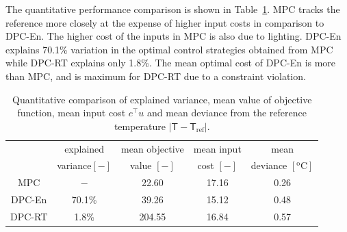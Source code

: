 The quantitative performance comparison is shown in Table~\ref{T:comparison}. MPC tracks the reference more closely at the expense of higher input costs in comparison to DPC-En. The higher cost of the inputs in MPC is also due to lighting. DPC-En explains 70.1\% variation in the optimal control strategies obtained from MPC while DPC-RT explains only 1.8\%. The mean optimal cost of DPC-En is more than MPC, and is maximum for DPC-RT due to a constraint violation.

\begin{table}[h!]
	\centering
	\begin{tabular}{ccccc}
		\toprule
		& explained & mean objective& mean input  & mean  \\
		&  variance$[\mathrm{-}]$ & value $[\mathrm{-}]$ & cost $[-]$ & deviance $[\mathrm{^oC}]$ \\     
		\midrule
		MPC    &  $\mathrm{-}$ &  22.60 & 17.16  &  0.26  \\
		DPC-En   & 70.1\% &  39.26  & 15.12 &  0.48 \\
		DPC-RT  & 1.8\% & 204.55 & 16.84 &  0.57 \\
		\bottomrule
	\end{tabular}
	\vspace{0.2cm}
	\caption{Quantitative comparison of explained variance, mean value of objective function, mean input cost $c^\top u$ and mean deviance from the reference temperature $|\mathsf{T}-\mathsf{T}_{\mathrm{ref}}|$.}
	\captionsetup{justification=centering}
	\label{T:comparison}
\end{table}

